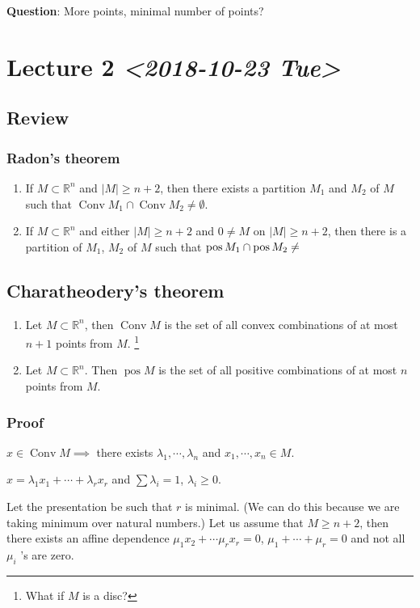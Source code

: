 \documentclass[11pt]{article}
\def\R{\mathbb{R}}
\def\pos{\operatorname{pos}}
\def\conv{\operatorname{Conv}}
\begin{document}
\textbf{Question}: More points, minimal number of points?
\section{Lecture 2 \textit{<2018-10-23 Tue>}}
\label{sec:org1d1477a}
\subsection{Review}
\label{sec:orgb38f206}
\subsubsection{Radon's theorem}
\label{sec:orgce39abe}
\begin{enumerate}
\item If \(M \subset \R^n\) and \(\vert M \vert \ge n+2\), then there exists a
partition \(M_1\) and \(M_2\) of \(M\) such that \(\conv M_1 \cap \conv M_2 \neq
       \emptyset\).
\item If \(M \subset \R^n\) and either \(\vert M \vert \ge n+2\) and \(0\neq M\) on
\(\vert M \vert \ge n+2\), then there is a partition of \(M_1\), \(M_2\) of \(M\)
such that \(\pos M_1 \cap \pos M_2 \neq \empty\)
\end{enumerate}
\subsection{Charatheodery's theorem}
\label{sec:org6d9c9da}
\begin{enumerate}
\item Let \(M\subset \R^n\), then \(\conv M\) is the set of all convex combinations
of at most \(n+1\) points from \(M\). \footnote{What if \(M\) is a disc?}
\item Let \(M\subset \R^n\). Then \(\pos M\) is the set of all positive combinations
of at most \(n\) points from \(M\).
\end{enumerate}
\subsubsection{Proof}
\label{sec:org47b6b87}
\(x\in \conv M \implies\) there exists \(\lambda_1, \cdots, \lambda_n\) and \(x_1,\cdots, x_n \in M\). 

\(x=\lambda_1x_1+\cdots + \lambda_rx_r\) and \(\sum \lambda_i = 1\), \(\lambda_i \ge 0\).

Let the presentation be such that \(r\) is minimal. (We can do this because we
are taking minimum over natural numbers.) Let us assume that \(M \ge n+2\),
then there exists an affine dependence \(\mu_1x_2 + \cdots \mu_rx_r = 0\),
\(\mu_1 + \cdots + \mu_r = 0\) and not all \(\mu_i\) 's are zero.
\end{document}
